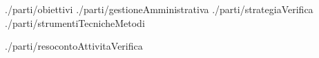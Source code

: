 \documentclass[a4paper,12pt]{article}
\title{\titoloDoc}
\newcommand{\parti}{./parti/}
\newcommand{\temp}{../../Template/}
\begin{document}
	\newpage
	\newpage
	\tableofcontents %
	\newpage
	\newpage
	
	\newpage
	 {\parti obiettivi}
	\newpage
	 {\parti gestioneAmministrativa}
	\newpage
	 {\parti strategiaVerifica}
	\newpage
	 {\parti strumentiTecnicheMetodi}
	\newpage
	
	\begin{appendices}
		\newpage
		 {\parti resocontoAttivitaVerifica}
	\end{appendices}
\end{document}

